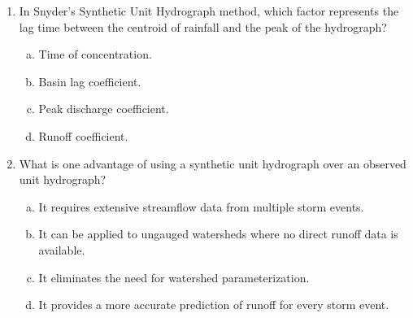 \documentclass[12pt]{article}
\begin{document}
\begin{enumerate}
\item In Snyder's Synthetic Unit Hydrograph method, which factor represents the lag time between the centroid of rainfall and the peak of the hydrograph?
\begin{enumerate}[a)]
\item Time of concentration.
\item Basin lag coefficient.
\item Peak discharge coefficient.
\item Runoff coefficient.
\end{enumerate}
\clearpage
\item What is one advantage of using a synthetic unit hydrograph over an observed unit hydrograph?
\begin{enumerate}[a)]
\item It requires extensive streamflow data from multiple storm events.
\item It can be applied to ungauged watersheds where no direct runoff data is available.
\item It eliminates the need for watershed parameterization.
\item It provides a more accurate prediction of runoff for every storm event.
\end{enumerate}

\clearpage
\end{enumerate}
\end{document}
